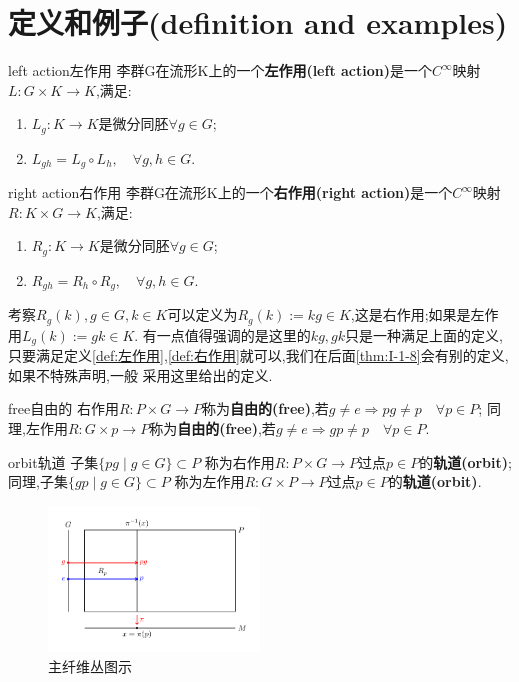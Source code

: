 \documentclass[../main.tex]{subfiles}
\begin{document}
 \section{定义和例子(definition and examples)}
 \begin{definition}
 {left action}{左作用} 
 李群G在流形K上的一个\textbf{左作用(left action)}是一个$C^\infty$映射$L:G \times K \to K$,满足:
 \begin{enumerate}
   \item $L_g: K \to K$是微分同胚$\forall  g \in  G$;
   \item $L_{gh} = L_g \circ L_h, \quad \forall g,h \in  G$.
 \end{enumerate}
\end{definition}
\begin{definition}
   {right action}{右作用} 
 李群G在流形K上的一个\textbf{右作用(right action)}是一个$C^\infty$映射$R:K \times G \to K$,满足:
 \begin{enumerate}
   \item $R_g: K \to K$是微分同胚$\forall  g \in  G$;
   \item $R_{gh} = R_h \circ R_g, \quad \forall g,h \in  G$.
 \end{enumerate}
\end{definition}
 \begin{note}
 考察$R_g(k), g\in G,k \in K$可以定义为$R_g(k) := kg \in K$,这是右作用;如果是左作用$L_g(k) := gk \in K$.
 有一点值得强调的是这里的$kg,gk$只是一种满足上面的定义,只要满足定义\ref{def:左作用},\ref{def:右作用}就可以,我们在后面\ref{thm:I-1-8}会有别的定义,如果不特殊声明,一般
 采用这里给出的定义.
 \end{note} 
 \begin{definition}
 {free}{自由的}
 右作用$R:P \times G \to P$称为\textbf{自由的(free)},若$g \neq e \Rightarrow pg \neq p \quad \forall p \in  P$;
 同理,左作用$R:G \times p \to P$称为\textbf{自由的(free)},若$g \neq e \Rightarrow gp \neq p \quad \forall p \in  P$.
 \end{definition}
 \begin{definition}
 {orbit}{轨道}
 子集$\{pg \mid g \in  G\} \subset P$ 称为右作用$R: P\times G\to P$过点$p \in P$的\textbf{轨道(orbit)};
 同理,子集$\{gp \mid g \in  G\} \subset P$ 称为左作用$R: G \times P\to P$过点$p \in P$的\textbf{轨道(orbit)}.
 \end{definition}
 \begin{figure}[htpb]
 \centering
 \includegraphics[width=0.5\textwidth]{../tikzpicture/principalfiberbundles}
 \caption{主纤维丛图示}
 \label{fig:I-1-1}
 \end{figure}
\end{document}
